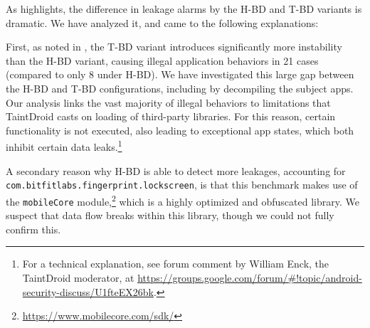 As  highlights, the difference in leakage alarms by the H-BD and T-BD variants is dramatic. We have analyzed it, and came to the following explanations:
\begin{compactitem}
\item First, as noted in , the T-BD variant introduces significantly more instability than the H-BD variant, causing illegal application behaviors in 21 cases (compared to only 8 under H-BD). We have investigated this large gap between the H-BD and T-BD configurations, including by decompiling the subject apps. Our analysis links the vast majority of illegal behaviors to limitations that
TaintDroid casts on loading of third-party libraries. For this reason, certain functionality is not executed, also leading to exceptional app states, which both inhibit certain data leaks.\footnote{
	For a technical explanation, see forum comment by William Enck, the TaintDroid moderator, at \href{https://groups.google.com/forum/\#!topic/android-security-discuss/U1fteEX26bk}{https://groups.google.com/forum/\#!topic/android-security-discuss/U1fteEX26bk}.
} 
\item A secondary reason why H-BD is able to detect more leakages, accounting for {\tt com.bitfitlabs.fingerprint.lockscreen}, is that this benchmark makes use of the {\tt mobileCore} module,\footnote{ 
\href{https://www.mobilecore.com/sdk/}{https://www.mobilecore.com/sdk/}
} which is a highly optimized and obfuscated library. We suspect that data flow breaks within this library, though we could not fully confirm this. 
\end{compactitem}
